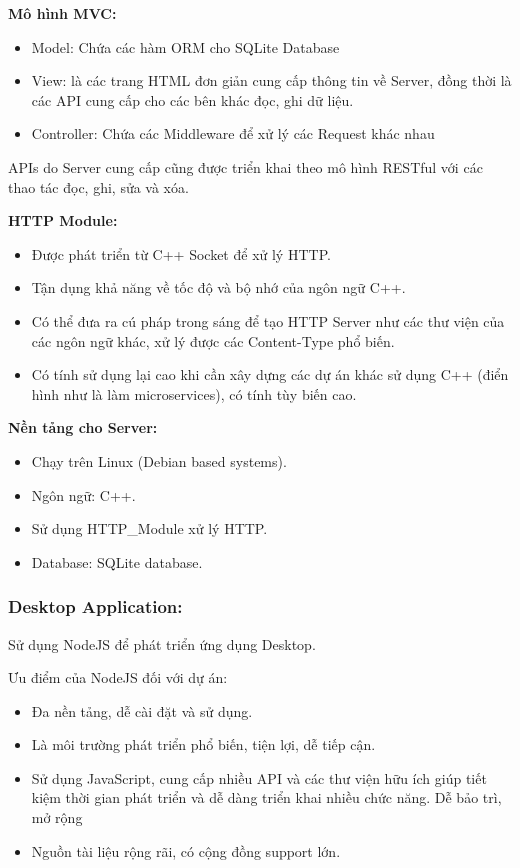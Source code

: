 \documentclass{article}
\begin{document}
\textbf{Mô hình MVC:}
\begin{itemize}
    \item Model: Chứa các hàm ORM cho SQLite Database
    \item View: là các trang HTML đơn giản cung cấp thông tin về Server, đồng thời là các API cung cấp cho các bên khác đọc, ghi dữ liệu. 
    \item Controller: Chứa các Middleware để xử lý các Request khác nhau
\end{itemize}
APIs do Server cung cấp cũng được triển khai theo mô hình RESTful với các thao tác đọc, ghi, sửa và xóa. 

\textbf{HTTP Module: }
\begin{itemize}
    \item Được phát triển từ C++ Socket để xử lý HTTP. 
    \item Tận dụng khả năng về tốc độ và bộ nhớ của ngôn ngữ C++. 
    \item Có thể đưa ra cú pháp trong sáng để tạo HTTP Server như các thư viện của các ngôn ngữ khác, xử lý được các Content-Type phổ biến.
    \item Có tính sử dụng lại cao khi cần xây dựng các dự án khác sử dụng C++ (điển hình như là làm microservices), có tính tùy biến cao.
\end{itemize}
\textbf{Nền tảng cho Server: }
\begin{itemize}
    \item Chạy trên Linux (Debian based systems). 
    \item Ngôn ngữ: C++. 
    \item Sử dụng HTTP\_Module xử lý HTTP. 
    \item Database: SQLite database. 
\end{itemize}
\subsubsection{Desktop Application: }
Sử dụng NodeJS để phát triển ứng dụng Desktop. 

Ưu điểm của NodeJS đối với dự án: 
\begin{itemize}
    \item Đa nền tảng, dễ cài đặt và sử dụng. 
    \item Là môi trường phát triển phổ biến, tiện lợi, dễ tiếp cận. 
    \item Sử dụng JavaScript, cung cấp nhiều API và các thư viện hữu ích giúp tiết kiệm thời gian phát triển và dễ dàng triển khai nhiều chức năng. Dễ bảo trì, mở rộng
    \item Nguồn tài liệu rộng rãi, có cộng đồng support lớn. 
\end{itemize}
\end{document}
